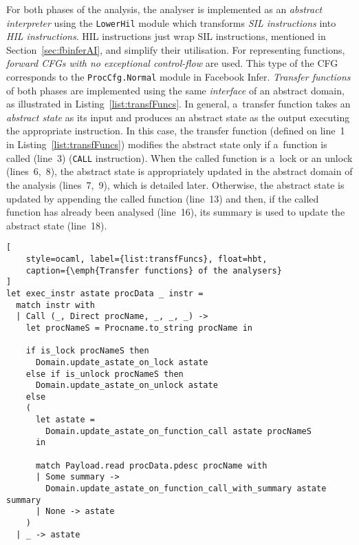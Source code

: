 For both phases of the analysis, the analyser is implemented as an
\emph{abstract interpreter} using the \texttt{LowerHil} module which
transforms \emph{SIL instructions} into \emph{HIL instructions}.
HIL instructions just wrap SIL instructions, mentioned in
Section~\ref{sec:fbinferAI}, and simplify their utilisation. For
representing functions, \emph{forward CFGs with no exceptional
control-flow} are used. This type of the CFG corresponds to the
\texttt{ProcCfg.Normal} module in Facebook Infer. \emph{Transfer 
functions} of both phases are implemented using the same \emph{interface}
of an abstract domain, as illustrated in Listing~\ref{list:transfFuncs}.
In general, a~transfer function takes an \emph{abstract state} as its 
input and produces an abstract state as the output executing the 
appropriate instruction. In this case, the transfer function (defined on
line~1 in Listing~\ref{list:transfFuncs}) modifies the abstract state only 
if a~function is called (line~3) (\texttt{CALL} instruction). When the 
called function is a~lock or an unlock (lines~6,~8), the abstract state is
appropriately updated in the abstract domain of the analysis (lines~7,~9), 
which is detailed later. Otherwise, the abstract state is updated 
by appending the called function (line~13) and then, if the called function 
has already been analysed (line~16), its summary is used to update the 
abstract state (line~18).

\begin{lstlisting}[
    style=ocaml, label={list:transfFuncs}, float=hbt,
    caption={\emph{Transfer functions} of the analysers}
]
let exec_instr astate procData _ instr =
  match instr with
  | Call (_, Direct procName, _, _, _) ->
    let procNameS = Procname.to_string procName in

    if is_lock procNameS then
      Domain.update_astate_on_lock astate
    else if is_unlock procNameS then
      Domain.update_astate_on_unlock astate
    else
    (
      let astate =
        Domain.update_astate_on_function_call astate procNameS
      in

      match Payload.read procData.pdesc procName with
      | Some summary ->
        Domain.update_astate_on_function_call_with_summary astate summary
      | None -> astate
    )
  | _ -> astate
\end{lstlisting}

